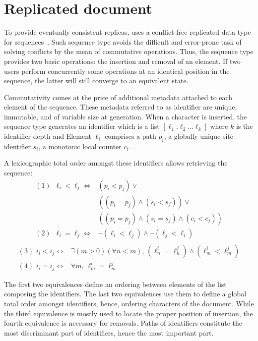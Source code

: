 
\section{Replicated document}
\label{sec:structure}

To provide eventually consistent replicas, \CRATE uses a conflict-free
replicated data type for sequences~\cite{shapiro2011comprehensive}. Such
sequence type avoids the difficult and error-prone task of solving conflicts by
the mean of commutative operations. Thus, the sequence type provides two basic
operations: the insertion and removal of an element. If two users perform
concurrently some operations at an identical position in the sequence, the
latter will still converge to an equivalent state.

Commutativity comes at the price of additional metadata attached to each
element of the sequence. These metadata referred to as identifier are unique,
immutable, and of variable size at generation. When a character is inserted, the
sequence type generates an identifier which is a list
$[\ell_1.\ell_2\ldots \ell_k]$ where $k$ is the identifier depth and Element
$\ell_i$ comprises a path $p_i$, a globally unique site identifier $s_i$, a
monotonic local counter $c_i$.

A lexicographic total order amongst these identifiers allows retrieving the
sequence:
\begin{align*}
(1)\,\,\,  \ell_i < \ell_j \iff & (p_i < p_j) \vee \\
                       & ((p_i = p_j) \wedge (s_i<s_j)) \vee \\
                       & ((p_i = p_j) \wedge (s_i = s_j) \wedge (c_i < c_j)) \\
(2)\,\,\,  \ell_i = \ell_j \iff & \neg (\ell_i < \ell_j) \wedge \neg (\ell_j < \ell_i) \\
\end{align*}
\begin{align*}
(3)\,\,  i_i < i_j \iff & \exists (m > 0)(\forall n < m),\, (\ell^i_n = \ell^j_n) \wedge (\ell^i_m < \ell^j_m) \\
(4)\,\,  i_i = i_j \iff & \forall m,\, \ell^i_m = \ell^j_m
\end{align*}

The first two equivalences define an ordering between elements of the list
composing the identifiers. The last two equivalences use them to define a global
total order amongst identifiers, hence, ordering characters of the
document. While the third equivalence is mostly used to locate the proper
position of insertion, the fourth equivalence is necessary for removals.  Paths
of identifiers constitute the most discriminant part of identifiers, hence the
most important part.

